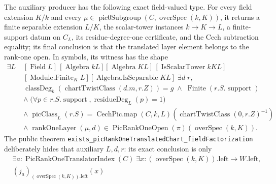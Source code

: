 \begin{theorem}
  \label{route-thm-translated-coverage}
  \leanok

  The auxiliary producer has the following exact field-valued type.  For every
  field extension \(K/k\) and every
  \(\mu\in\operatorname{pic0Subgroup}(C,\operatorname{overSpec}(k,K))\), it
  returns a
  finite separable extension \(L/K\), the scalar-tower instances
  \(k\to K\to L\), a finite-support datum on \(C_L\), its
  residue-degree-one certificate, and the Cech subtraction equality; its final
  conclusion is that the translated layer element belongs to the rank-one open.
  In symbols, its witness has the shape
  \[
    \begin{aligned}
    \exists L\;&[\operatorname{Field}L]\,[\operatorname{Algebra}kL]
      [\operatorname{Algebra}KL]\,[\operatorname{IsScalarTower}kKL]\\
      & [\operatorname{Module.Finite}_K L]
      [\operatorname{Algebra.IsSeparable}KL]\;\exists d\;r,\\
      &\operatorname{classDeg}_k(\operatorname{chartTwistClass}(d.m,r.Z))=g
        \;\wedge\;\operatorname{Finite}(r.S.\operatorname{support})\\
      &\wedge\;\bigl(\forall p\in r.S.\operatorname{support},
        \operatorname{residueDeg}_L(p)=1\bigr)\\
      &\wedge\;\operatorname{picClass}_L(r.S)=
        \operatorname{CechPic.map}(C,k,L)
          (\operatorname{chartTwistClass}(0,r.Z)^{-1})\\
      &\wedge\;\operatorname{rankOneLayer}(\mu,d)\in
        \operatorname{PicRankOneOpen}(\pi)(\operatorname{overSpec}(k,K)).
    \end{aligned}
  \]
  The public theorem
  \texttt{exists\_picRankOneTranslatedChart\_fieldFactorization} deliberately
  hides that auxiliary \(L,d,r\): its exact conclusion is only
  \[
    \begin{aligned}
      &\exists a:\operatorname{PicRankOneTranslatorIndex}(C)\;\exists x:
        (\operatorname{overSpec}(k,K)).\mathrm{left}
          \longrightarrow W.\mathrm{left},\\
      &(j_a)_{(\operatorname{overSpec}(k,K)).\mathrm{left}}(x)

\end{aligned}\]
\end{theorem}
